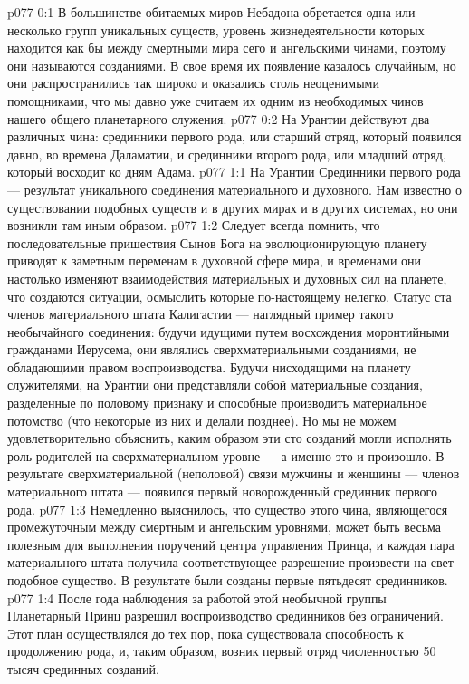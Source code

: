 \author{Архангел}
\vs p077 0:1 В большинстве обитаемых миров Небадона обретается одна или несколько групп уникальных существ, уровень жизнедеятельности которых находится как бы между смертными мира сего и ангельскими чинами, поэтому они называются  созданиями. В свое время их появление казалось случайным, но они распространились так широко и оказались столь неоценимыми помощниками, что мы давно уже считаем их одним из необходимых чинов нашего общего планетарного служения.
\vs p077 0:2 На Урантии действуют два различных чина: срединники первого рода, или старший отряд, который появился давно, во времена Даламатии, и срединники второго рода, или младший отряд, который восходит ко дням Адама.
\vs p077 1:1 На Урантии Срединники первого рода --- результат уникального соединения материального и духовного. Нам известно о существовании подобных существ и в других мирах и в других системах, но они возникли там иным образом.
\vs p077 1:2 Следует всегда помнить, что последовательные пришествия Сынов Бога на эволюционирующую планету приводят к заметным переменам в духовной сфере мира, и временами они настолько изменяют взаимодействия материальных и духовных сил на планете, что создаются ситуации, осмыслить которые по\hyp{}настоящему нелегко. Статус ста членов материального штата Калигастии --- наглядный пример такого необычайного соединения: будучи идущими путем восхождения моронтийными гражданами Иерусема, они являлись сверхматериальными созданиями, не обладающими правом воспроизводства. Будучи нисходящими на планету служителями, на Урантии они представляли собой материальные создания, разделенные по половому признаку и способные производить материальное потомство (что некоторые из них и делали позднее). Но мы не можем удовлетворительно объяснить, каким образом эти сто созданий могли исполнять роль родителей на сверхматериальном уровне --- а именно это и произошло. В результате сверхматериальной (неполовой) связи мужчины и женщины --- членов материального штата --- появился первый новорожденный срединник первого рода.
\vs p077 1:3 Немедленно выяснилось, что существо этого чина, являющегося промежуточным между смертным и ангельским уровнями, может быть весьма полезным для выполнения поручений центра управления Принца, и каждая пара материального штата получила соответствующее разрешение произвести на свет подобное существо. В результате были созданы первые пятьдесят срединников.
\vs p077 1:4 После года наблюдения за работой этой необычной группы Планетарный Принц разрешил воспроизводство срединников без ограничений. Этот план осуществлялся до тех пор, пока существовала способность к продолжению рода, и, таким образом, возник первый отряд численностью 50 тысяч срединных созданий.
